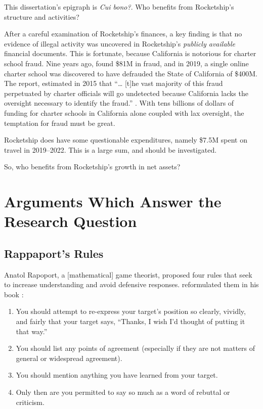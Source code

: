 This dissertation's epigraph is \textit{Cui bono?}. Who benefits from Rocketship's structure and activities?

After a careful examination of Rocketship's finances, a key finding is that no evidence of illegal activity was uncovered in Rocketship's \textit{publicly available} financial documents. This is fortunate, because California is notorious for charter school fraud. Nine years ago, \textcite{CPD2015} found \$81M in fraud, and in 2019, a single online charter school was discovered to have defrauded the State of California of \$400M. The report,  estimated in 2015 that ``\ldots{} [t]he vast majority of this fraud perpetuated by charter officials will go undetected because California lacks the oversight necessary to identify the fraud.'' \parencite[2]{CPD2015}. With tens billions of dollars of funding for charter schools in California alone coupled with lax oversight, the temptation for fraud must be great. 

Rocketship does have some questionable expenditures, namely \$7.5M spent on travel in 2019–2022. This is a large sum, and should be investigated.

So, who benefits from Rocketship's growth in net assets?

\section{Arguments Which Answer the Research Question}%
\label{sec:appr-answ-rese-quest}\indent%

\subsection{Rappaport's Rules}%
\label{sec:rappaports-rules}\indent%

Anatol Rapoport, a [mathematical] game theorist, proposed four rules that seek to increase understanding and avoid defensive responses.  reformulated them in his book  \parencite{Dennett2013}:
\begin{enumerate}[topsep=0.3\baselineskip,itemsep=0.25\baselineskip]
  \item You should attempt to re-express your target’s position so clearly, vividly, and fairly that your target says, “Thanks, I wish I’d thought of putting it that way.”
  \item You should list any points of agreement (especially if they are not matters of general or widespread agreement).
  \item You should mention anything you have learned from your target.
  \item Only then are you permitted to say so much as a word of rebuttal or criticism.
\end{enumerate}
\medskip

